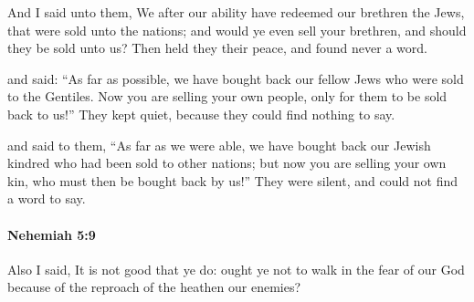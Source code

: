 			\begin{versebox}
					\item[BHS] 
					\item[LXX] 
					\item[ASV] And I said unto them, We after our ability have redeemed our brethren the Jews, that were sold unto the nations; and would ye even sell your brethren, and should they be sold unto us? Then held they their peace, and found never a word.
					\item[NIV] and said: “As far as possible, we have bought back our fellow Jews who were sold to the Gentiles. Now you are selling your own people, only for them to be sold back to us!” They kept quiet, because they could find nothing to say.
					\item[NRSV] and said to them, “As far as we were able, we have bought back our Jewish kindred who had been sold to other nations; but now you are selling your own kin, who must then be bought back by us!” They were silent, and could not find a word to say.
			\end{versebox}

		\paragraph{Nehemiah 5:9} %
			\label{NEHEMIAH-5-9}

			Also I said, It is not good that ye do: ought ye not to walk in the fear of our God because of the reproach of the heathen our enemies?

